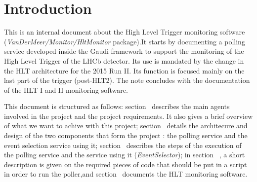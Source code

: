 \section{Introduction}\label{sec:Introduction}

This is an internal document about the High Level Trigger monitoring software (\textit{VanDerMeer/Monitor/HltMonitor} package).It starts by documenting a polling service developed inside the Gaudi framework to support the monitoring of the High Level Trigger of the LHCb detector. Its use is mandated by the change in the HLT architecture for the 2015 Run II. Its function is focused mainly on the last part of the trigger (post-HLT2). The note concludes with the documentation of the HLT I and II monitoring software.\par

This document is structured as follows: 
section~\textit{} describes the main agents involved in the project and the project requirements. It also gives a brief overview of what we want to achive with this project;
section~\textit{} details the architecure and design of the two components that form the project : the polling service and the event selection service using it;
section~\textit{} describes the steps of the execution of the polling service and the service using it (\textit{EventSelector});
in section~\textit{  }, a short description is given on the required pieces of code that should be put in a script in order to run the poller,and
section~\textit{} documents the HLT monitoring software.\par

